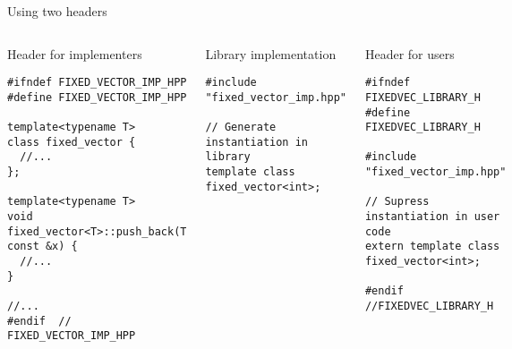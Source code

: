 \begin{frame}[t,fragile]{Using two headers}

\begin{columns}[T]

\begin{block}{Header for implementers}
\begin{lstlisting}[basicstyle=\tiny]
#ifndef FIXED_VECTOR_IMP_HPP
#define FIXED_VECTOR_IMP_HPP

template<typename T>
class fixed_vector {
  //...
};

template<typename T>
void 
fixed_vector<T>::push_back(T const &x) {
  //...
}

//...
#endif  // FIXED_VECTOR_IMP_HPP

\end{lstlisting}
\end{block}

\begin{block}{Library implementation}
\begin{lstlisting}[basicstyle=\tiny]
#include "fixed_vector_imp.hpp"

// Generate instantiation in library
template class fixed_vector<int>;
\end{lstlisting}
\end{block}

\begin{block}{Header for users}
\begin{lstlisting}[basicstyle=\tiny]
#ifndef FIXEDVEC_LIBRARY_H
#define FIXEDVEC_LIBRARY_H

#include "fixed_vector_imp.hpp"

// Supress instantiation in user code
extern template class fixed_vector<int>;

#endif //FIXEDVEC_LIBRARY_H
\end{lstlisting}
\end{block}

\end{columns}
\end{frame}
